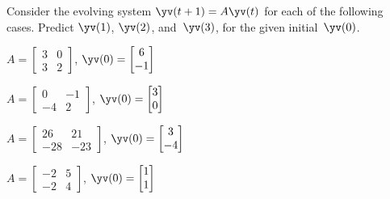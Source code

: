 \begin{exercise} \label{ex:yay} 
Consider the evolving system \(\yv(t+1)=A\yv(t)\) for each of the following cases. 
Predict \(\yv(1)\), \(\yv(2)\), and~\(\yv(3)\), for the given initial~\(\yv(0)\).
\begin{Parts}
\item \(A=\begin{bmatrix} 3 & 0
\\3 & 2 \end{bmatrix}\), 
\(\yv(0)=\begin{bmatrix} 6
\\-1 \end{bmatrix}\)

\item \(A=\begin{bmatrix} 0 & -1
\\-4 & 2 \end{bmatrix}\), 
\(\yv(0)=\begin{bmatrix} 3
\\0 \end{bmatrix}\)

\begin{OmitV1}
\item \(A=\begin{bmatrix} 26 & 21
\\-28 & -23 \end{bmatrix}\), 
\(\yv(0)=\begin{bmatrix} 3
\\-4 \end{bmatrix}\)

\item \(A=\begin{bmatrix} -2 & 5
\\-2 & 4 \end{bmatrix}\), 
\(\yv(0)=\begin{bmatrix} 1
\\1 \end{bmatrix}\)
\end{OmitV1}


\end{Parts}
\end{exercise}
